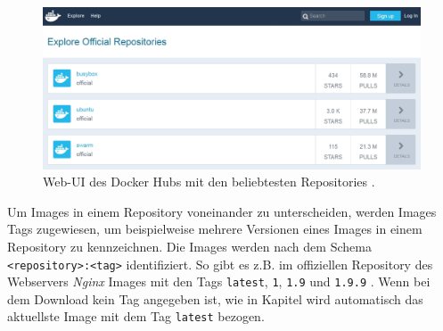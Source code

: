 \documentclass[../main.tex]{subfiles}
\begin{document}
      \begin{figure}[h]
          \centering
          \includegraphics[width=1.0\textwidth]{./images/intro_registry.jpg}
          \caption{Web-\acrshort{UI} des Docker Hubs mit den beliebtesten Repositories \cite{dockerHub}.}
          \label{fig:intro_registry}
      \end{figure}

			Um Images in einem Repository voneinander zu unterscheiden, werden Images Tags zugewiesen, um beispielweise mehrere Versionen eines Images in einem Repository zu kennzeichnen. Die Images werden nach dem Schema \texttt{<repository>:<tag>} identifiziert. So gibt es z.B. im offiziellen Repository des Webservers \emph{Nginx} Images mit den Tags \texttt{latest}, \texttt{1}, \texttt{1.9} und \texttt{1.9.9} \cite{dockerHubNginx}. Wenn bei dem Download kein Tag angegeben ist, wie in Kapitel wird automatisch das aktuellste Image mit dem Tag \texttt{latest} bezogen.




\end{document}
